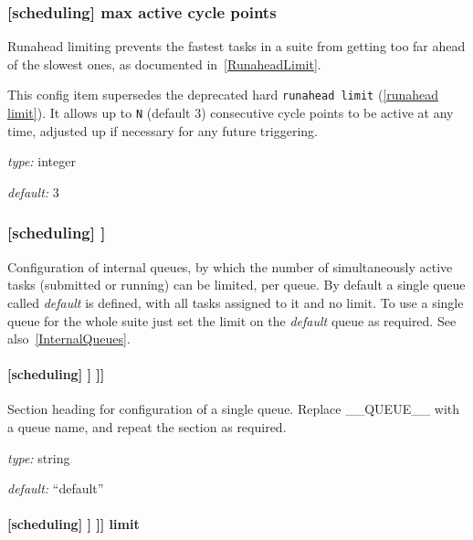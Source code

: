\subsubsection[max active cycle points]{[scheduling] \textrightarrow
 max active cycle points}
\label{max active cycle points}

Runahead limiting prevents the fastest tasks in a suite from getting too far
ahead of the slowest ones, as documented in~\ref{RunaheadLimit}.

This config item supersedes the deprecated hard \lstinline=runahead limit= 
(\ref{runahead limit}). It allows up to \lstinline=N= (default 3) consecutive
cycle points to be active at any time, adjusted up if necessary for
any future triggering.

\begin{myitemize}
    \item {\em type:} integer
    \item {\em default:} 3
\end{myitemize}


\subsubsection[{[[}queues{]]}]{[scheduling] \textrightarrow [[queues]]}

Configuration of internal queues, by which the number of simultaneously
active tasks (submitted or running) can be limited, per queue. By
default a single queue called {\em default} is defined, with all tasks
assigned to it and no limit. To use a single queue for the whole suite
just set the limit on the {\em default} queue as required.
See also~\ref{InternalQueues}.

\paragraph[{[[[}\_\_QUEUE\_\_{]]]}]{[scheduling] \textrightarrow [[queues]] \textrightarrow [[[\_\_QUEUE\_\_]]]}

Section heading for configuration of a single queue. Replace
\_\_QUEUE\_\_ with a queue name, and repeat the section as required.

\begin{myitemize}
\item {\em type:} string
\item {\em default:} ``default''
\end{myitemize}

\paragraph[limit]{[scheduling] \textrightarrow [[queues]] \textrightarrow [[[\_\_QUEUE\_\_]]] \textrightarrow limit}

